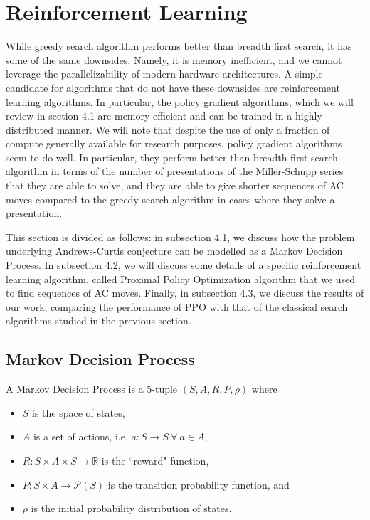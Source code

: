 
\section{Reinforcement Learning}

While greedy search algorithm performs better than breadth first search, it has some of the same downsides. Namely, it is memory inefficient, and we cannot leverage the parallelizability of modern hardware architectures. A simple candidate for algorithms that do not have these downsides are reinforcement learning algorithms. In particular, the policy gradient algorithms, which we will review in section 4.1 are memory efficient and can be trained in a highly distributed manner. We will note that despite the use of only a fraction of compute generally available for research purposes, policy gradient algorithms seem to do well. In particular, they perform better than breadth first search algorithm in terms of the number of presentations of the Miller-Schupp series that they are able to solve, and they are able to give shorter sequences of AC moves compared to the greedy search algorithm in cases where they solve a presentation. 

This section is divided as follows: in subsection 4.1, we discuss how the problem underlying Andrews-Curtis conjecture can be modelled as a Markov Decision Process. In subsection 4.2, we will discuss some details of a specific reinforcement learning algorithm, called Proximal Policy Optimization algorithm that we used to find sequences of AC moves. Finally, in subsection 4.3, we discuss the results of our work, comparing the performance of PPO with that of the classical search algorithms studied in the previous section. 

\subsection{Markov Decision Process}

A Markov Decision Process is a 5-tuple $(S, A, R, P, \rho)$ where 
\begin{itemize}
	\item $S$ is the space of states, 
	\item $A$ is a set of actions, i.e. $a \colon S \to S \ \forall \ a \in A$, 
	\item $R \colon S \times A \times S \to \mathbb{R}$ is the ``reward" function, 
	\item $P \colon S \times A \to \mathcal{P}(S)$ is the transition probability function, and 
	\item $\rho$ is the initial probability distribution of states. 
\end{itemize}

